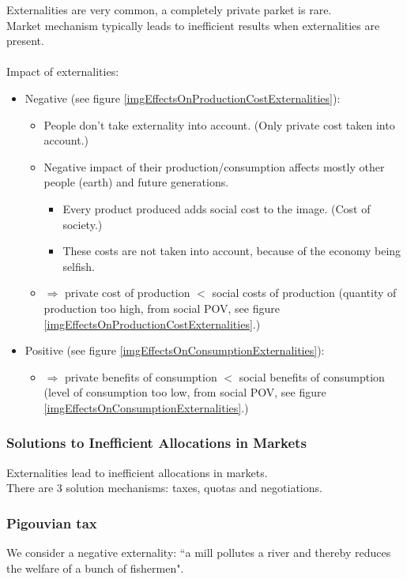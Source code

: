 \documentclass[12pt, a4paper, titlepage]{extarticle}
\begin{document}
	Externalities are very common, a completely private parket is rare.\\
	Market mechanism typically leads to inefficient results when externalities are present.\\
	\\
	Impact of externalities:
	\begin{itemize}
		\item Negative (see figure \ref{imgEffectsOnProductionCostExternalities}):
			\begin{itemize}
				\item People don't take externality into account. (Only private cost taken into account.)
				\item Negative impact of their production/consumption affects mostly other people (earth) and future generations.
					\begin{itemize}
						\item Every product produced adds social cost to the image. (Cost of society.)
						\item These costs are not taken into account, because of the economy being selfish.
					\end{itemize}
				\item $\Rightarrow$ private cost of production $<$ social costs of production (quantity of production too high, from social POV, see figure \ref{imgEffectsOnProductionCostExternalities}.)
			\end{itemize}
		\item Positive (see figure \ref{imgEffectsOnConsumptionExternalities}):
			\begin{itemize}
				\item $\Rightarrow$ private benefits of consumption $<$ social benefits of consumption (level of consumption too low, from social POV, see figure \ref{imgEffectsOnConsumptionExternalities}.)
			\end{itemize}
	\end{itemize}
	
	\subsubsection{Solutions to Inefficient Allocations in Markets}
	
	Externalities lead to inefficient allocations in markets.\\
	There are 3 solution mechanisms: taxes, quotas and negotiations.
	\subsubsection*{Pigouvian tax}
	We consider a negative externality: ``a mill pollutes a river and thereby reduces the welfare of a bunch of fishermen".
	
\end{document}
